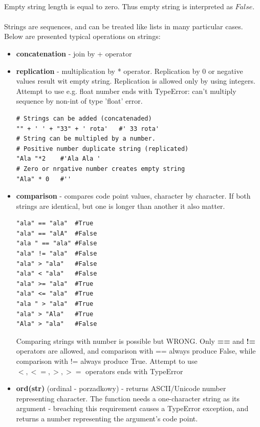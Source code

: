 \documentclass{article}
\begin{document}
	\paragraph{}
	Empty string length is equal to zero. Thus empty string is interpreted as $False$.
	\paragraph{}
	Strings are sequences, and can be treated like lists in many particular cases. Below are presented typical operations on strings:
\begin{itemize}
\item \textbf{concatenation} - join by + operator
\item \textbf{replication} - multiplication by * operator. Replication by 0 or negative values result wit empty string. Replication is allowed only by using integers. Attempt to use e.g. float number ends with \textcolor{pythonerror}{TypeError: can't multiply sequence by non-int of type 'float'} error.
	\begin{lstlisting}[style=pystyle]
# Strings can be added (concatenaded)
"" + ' ' + "33" + ' rota'	#' 33 rota'
# String can be multipled by a number.
# Positive number duplicate string (replicated)
"Ala "*2	#'Ala Ala '
# Zero or nrgative number creates empty string
"Ala" * 0	#''
	\end{lstlisting}
\item  \textbf{comparison} - compares code point values, character by character. If both strings are identical, but one is longer than another it also matter.
\begin{lstlisting}[style=pystyle]
"ala" == "ala"	#True
"ala" == "alA"	#False
"ala " == "ala"	#False
"ala" != "ala"	#False
"ala" > "ala"	#False
"ala" < "ala"	#False
"ala" >= "ala"	#True
"ala" <= "ala"	#True
"ala " > "ala"	#True
"ala" > "Ala"	#True
"Ala" > "ala"	#False
\end{lstlisting}
Comparing strings with number is possible but WRONG. Only \textbf{==} and \textbf{!=} operators are allowed, and comparison with == always produce False, while comparison with != always produce True. Attempt to use $<, <=, >, >=$ operators ends with \textcolor{pythonerror}{TypeError}
\item \textbf{ord(str)} (ordinal - porzadkowy) - returns ASCII/Unicode number representing character. The function needs a one-character string as its argument - breaching this requirement causes a \textcolor{pythonerror}{TypeError} exception, and returns a number representing the argument's code point.	

\end{itemize}
\end{document}
